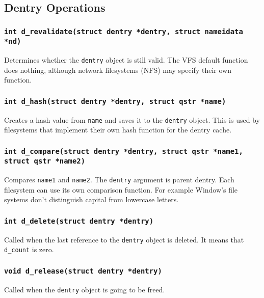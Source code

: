 \subsection{Dentry Operations}
\label{lab:dentry_ops}

\subsubsection{\texttt{int d\_revalidate(struct dentry *dentry, struct nameidata *nd)}}

Determines whether the \texttt{dentry} object is still valid. The VFS default
function does nothing, although network filesystems (NFS) may specify their own
function.

\subsubsection{\texttt{int d\_hash(struct dentry *dentry, struct qstr *name)}}

Creates a hash value from \texttt{name} and saves it to the \texttt{dentry} object. This
is used by filesystems that implement their own hash function for the dentry cache.

\subsubsection{\texttt{int d\_compare(struct dentry *dentry, struct qstr *name1,\\struct qstr
*name2)}}

Compares \texttt{name1} and \texttt{name2}. The \texttt{dentry} argument is parent
dentry. Each filesystem can use its own comparison function. For example Window's file
systems don't distinguish capital from lowercase letters.

\subsubsection{\texttt{int d\_delete(struct dentry *dentry)}}

Called when the last reference to the \texttt{dentry} object is deleted. It means that
\texttt{d\_count} is zero.

\subsubsection{\texttt{void d\_release(struct dentry *dentry)}}

Called when the \texttt{dentry} object is going to be freed.

